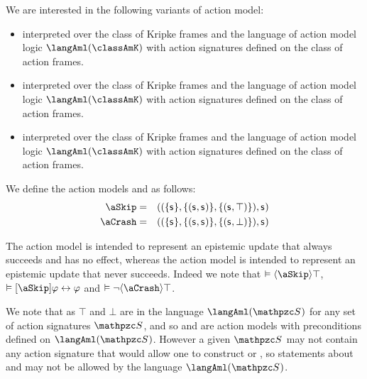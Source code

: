 We are interested in the following variants of action model:
\begin{itemize}
    \item \logicAmlK{} interpreted over the class of \classK{} Kripke frames and the language of action model logic $\langAml(\classAmK)$ with action signatures defined on the class of \classAmK{} action frames.
    \item \logicAmlKFF{} interpreted over the class of \classKFF{} Kripke frames and the language of action model logic $\langAml(\classAmK)$ with action signatures defined on the class of \classAmKFF{} action frames.
    \item \logicAmlS{} interpreted over the class of \classS{} Kripke frames and the language of action model logic $\langAml(\classAmK)$ with action signatures defined on the class of \classAmS{} action frames.
\end{itemize}

\begin{definition}
    We define the action models \aSkip{} and \aCrash{} as follows:
    \begin{eqnarray*}
        \aSkip &=& ((\{\aStateS\}, \{(\aStateS, \aStateS)\}, \{(\aStateS, \top)\}), \aStateS)\\
        \aCrash &=& ((\{\aStateS\}, \{(\aStateS, \aStateS)\}, \{(\aStateS, \bot)\}), \aStateS)
    \end{eqnarray*}
\end{definition}

The action model \aSkip{} is intended to represent an epistemic update that always succeeds and has no effect,
whereas the action model \aCrash{} is intended to represent an epistemic update that never succeeds.
Indeed we note that $\entails \actionE{\aSkip} \top$, $\entails \actionA{\aSkip} \phi \iff \phi$ and $\entails \lnot \actionE{\aCrash} \top$.

We note that as $\top$ and $\bot$ are in the language $\langAml(\aSignatureFamily)$ for any set of action signatures $\aSignatureFamily$, and so \aSkip{} and \aCrash{} are action models with preconditions defined on $\langAml(\aSignatureFamily)$.
However a given $\aSignatureFamily$ may not contain any action signature that would allow one to construct \aSkip{} or \aCrash{}, so statements about \aSkip{} and \aCrash{} may not be allowed by the language $\langAml(\aSignatureFamily)$.

